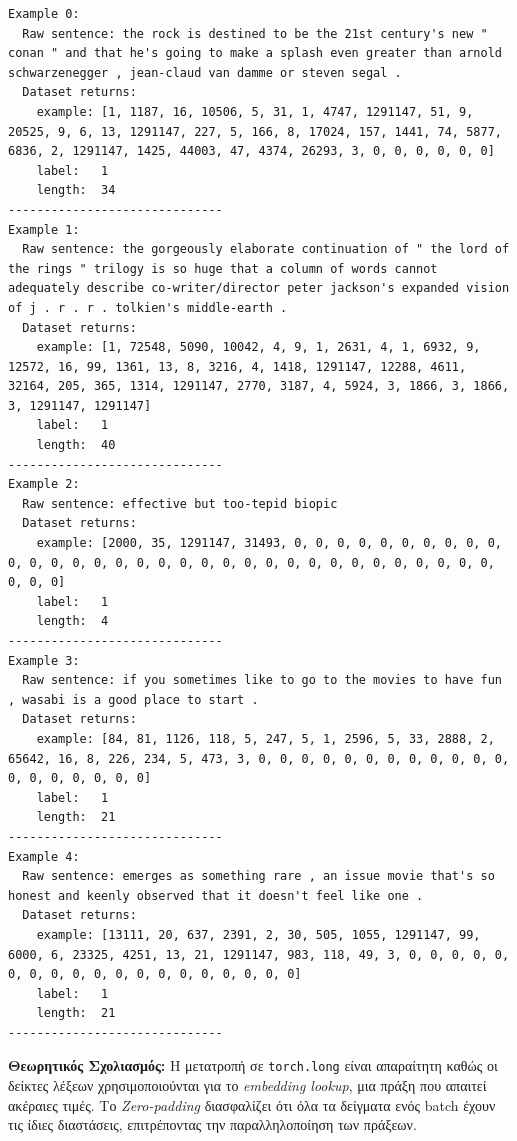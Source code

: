 \documentclass[12pt]{article}
\begin{document}
\begin{lstlisting}[language={}, basicstyle=\ttfamily\footnotesize]
Example 0:
  Raw sentence: the rock is destined to be the 21st century's new " conan " and that he's going to make a splash even greater than arnold schwarzenegger , jean-claud van damme or steven segal .
  Dataset returns:
    example: [1, 1187, 16, 10506, 5, 31, 1, 4747, 1291147, 51, 9, 20525, 9, 6, 13, 1291147, 227, 5, 166, 8, 17024, 157, 1441, 74, 5877, 6836, 2, 1291147, 1425, 44003, 47, 4374, 26293, 3, 0, 0, 0, 0, 0, 0]
    label:   1
    length:  34
------------------------------
Example 1:
  Raw sentence: the gorgeously elaborate continuation of " the lord of the rings " trilogy is so huge that a column of words cannot adequately describe co-writer/director peter jackson's expanded vision of j . r . r . tolkien's middle-earth .
  Dataset returns:
    example: [1, 72548, 5090, 10042, 4, 9, 1, 2631, 4, 1, 6932, 9, 12572, 16, 99, 1361, 13, 8, 3216, 4, 1418, 1291147, 12288, 4611, 32164, 205, 365, 1314, 1291147, 2770, 3187, 4, 5924, 3, 1866, 3, 1866, 3, 1291147, 1291147]
    label:   1
    length:  40
------------------------------
Example 2:
  Raw sentence: effective but too-tepid biopic
  Dataset returns:
    example: [2000, 35, 1291147, 31493, 0, 0, 0, 0, 0, 0, 0, 0, 0, 0, 0, 0, 0, 0, 0, 0, 0, 0, 0, 0, 0, 0, 0, 0, 0, 0, 0, 0, 0, 0, 0, 0, 0, 0, 0, 0]
    label:   1
    length:  4
------------------------------
Example 3:
  Raw sentence: if you sometimes like to go to the movies to have fun , wasabi is a good place to start .
  Dataset returns:
    example: [84, 81, 1126, 118, 5, 247, 5, 1, 2596, 5, 33, 2888, 2, 65642, 16, 8, 226, 234, 5, 473, 3, 0, 0, 0, 0, 0, 0, 0, 0, 0, 0, 0, 0, 0, 0, 0, 0, 0, 0, 0]
    label:   1
    length:  21
------------------------------
Example 4:
  Raw sentence: emerges as something rare , an issue movie that's so honest and keenly observed that it doesn't feel like one .
  Dataset returns:
    example: [13111, 20, 637, 2391, 2, 30, 505, 1055, 1291147, 99, 6000, 6, 23325, 4251, 13, 21, 1291147, 983, 118, 49, 3, 0, 0, 0, 0, 0, 0, 0, 0, 0, 0, 0, 0, 0, 0, 0, 0, 0, 0, 0]
    label:   1
    length:  21
------------------------------
\end{lstlisting}


\textbf{Θεωρητικός Σχολιασμός:}
Η μετατροπή σε \texttt{torch.long} είναι απαραίτητη καθώς οι δείκτες λέξεων χρησιμοποιούνται για το \textit{embedding lookup}, μια πράξη που απαιτεί ακέραιες τιμές. Το \textit{Zero-padding} διασφαλίζει ότι όλα τα δείγματα ενός batch έχουν τις ίδιες διαστάσεις, επιτρέποντας την παραλληλοποίηση των πράξεων.
\end{document}

